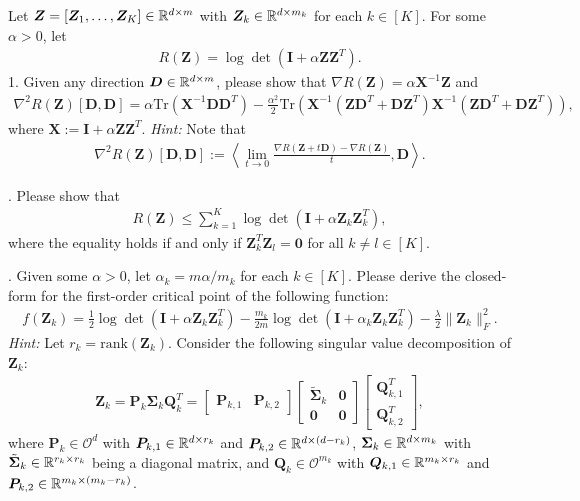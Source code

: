 \documentclass[../../book-main.tex]{subfiles}
\begin{document}
\begin{exercise}
    Let $\bm Z = [\bm Z_1,\dots,\bm Z_K] \in \mathbb{R}^{d\times m}$ with $\bm Z_k \in \mathbb{R}^{d\times m_k}$ for each $k \in [K]$. For some $\alpha > 0$, let 
    \begin{align*}
        R(\bm Z) = \log\det\left(\bm I + \alpha\bm Z\bm Z^T \right).
    \end{align*}
1. Given any direction $\bm D \in \mathbb{R}^{d\times m}$, please show that $\nabla R(\bm Z) = \alpha\bm X^{-1}\bm Z$ and 
    \begin{align*}
 \nabla^2 R(\bm Z)[\bm D, \bm D] =\alpha \mathrm{Tr}\left( \bm X^{-1}\bm D\bm D^T\right) - \frac{\alpha^2}{2}\mathrm{Tr}\left(\bm X^{-1}\left( \bm Z\bm D^T+\bm D\bm Z^T\right) \bm X^{-1}\left( \bm Z\bm D^T+\bm D\bm Z^T\right)\right),
    \end{align*}
    where $\bm X := \bm I + \alpha\bm Z\bm Z^T$. {\em Hint:} Note that
    \begin{align*}
        \nabla^2 R(\bm Z)[\bm D, \bm D] := \left\langle \lim_{t \to 0} \frac{\nabla R(\bm Z+ t\bm D) - \nabla R(\bm Z)}{t}, \bm D \right\rangle. 
    \end{align*}

. Please show that 
\begin{align*}
    R(\bm Z) \le \sum_{k=1}^K \log\det\left(\bm I + \alpha\bm Z_k\bm Z_k^T \right),
\end{align*}
where the equality holds if and only if $\bm Z_k^T\bm Z_l = \bm 0$ for all $k \neq l \in [K]$. 
\medskip 

. Given some $\alpha >0$, let $\alpha_k=m\alpha/m_k$ for each $k \in [K]$. Please derive the closed-form for the first-order critical point of the following function: 
\begin{align*}
    f(\bm Z_k) = \frac{1}{2}\log\det\left(\bm I + \alpha\bm Z_k\bm Z_k^T \right) - \frac{m_k}{2m}\log\det\left(\bm I + \alpha_k \bm Z_k\bm Z_k^T \right) - \frac{\lambda}{2}\|\bm Z_k\|_F^2. 
\end{align*}
{\em Hint:} Let $r_k=\mathrm{rank}(\bm Z_k)$. Consider the following singular value decomposition of $\bm Z_k$: 
\begin{align*}
    \bm Z_k = \bm P_k\bm \Sigma_k\bm Q_k^T = \begin{bmatrix}
        \bm P_{k,1} & \bm P_{k,2}
    \end{bmatrix} \begin{bmatrix}
        \tilde{\bm \Sigma}_{k} & \bm 0 \\
        \bm 0 & \bm 0
    \end{bmatrix} 
    \begin{bmatrix}
        \bm Q_{k,1}^T \\ \bm Q_{k,2}^T
    \end{bmatrix}, 
\end{align*}
where $\bm P_k \in \mathcal{O}^d$ with $\bm P_{k,1} \in \mathbb{R}^{d\times r_k}$ and  $\bm P_{k,2} \in \mathbb{R}^{d\times (d-r_k)}$, $\bm \Sigma_k \in \mathbb{R}^{d\times m_k}$ with $\tilde{\bm \Sigma}_{k} \in \mathbb{R}^{r_k\times r_k}$ being a diagonal matrix, and  $\bm Q_k \in \mathcal{O}^{m_k}$ with $\bm Q_{k,1} \in \mathbb{R}^{m_k\times r_k}$ and  $\bm P_{k,2} \in \mathbb{R}^{m_k \times (m_k-r_k)}$. 
\medskip 


\end{exercise}
\end{document}
